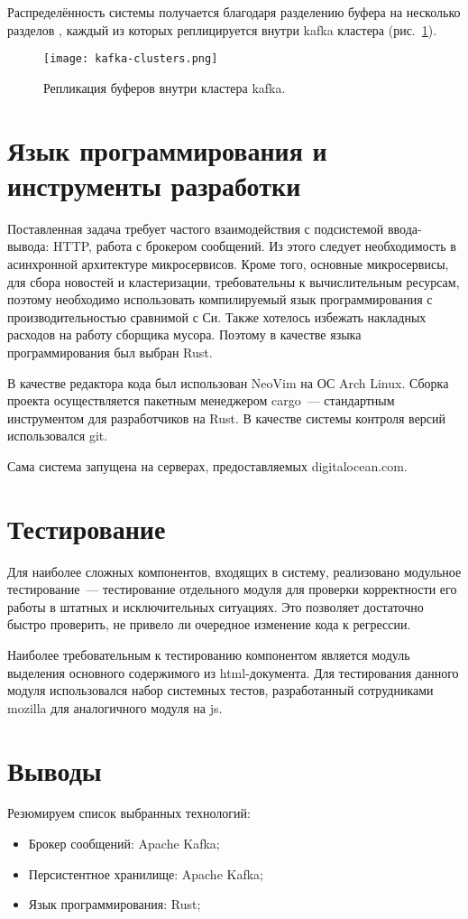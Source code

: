 Распределённость системы получается благодаря разделению буфера на несколько разделов \cite{wang12}, каждый из которых реплицируется внутри kafka кластера (рис.~\ref{fig:kafka-clusters}).

\begin{figure}[h]
    \centering
    \texttt{[image: kafka-clusters.png]}
    \caption{Репликация буферов внутри кластера kafka.}
    \label{fig:kafka-clusters}
\end{figure}

\section{Язык программирования и инструменты разработки}
Поставленная задача требует частого взаимодействия с подсистемой ввода-вывода: HTTP, работа с брокером сообщений. Из этого следует необходимость в асинхронной архитектуре микросервисов. Кроме того, основные микросервисы, для сбора новостей и кластеризации, требовательны к вычислительным ресурсам, поэтому необходимо использовать компилируемый язык программирования с производительностью сравнимой с Си. Также хотелось избежать накладных расходов на работу сборщика мусора. Поэтому в качестве языка программирования был выбран Rust.

В качестве редактора кода был использован NeoVim на ОС Arch Linux. Сборка проекта осуществляется пакетным менеджером cargo~--- стандартным инструментом для разработчиков на Rust. В качестве системы контроля версий использовался git.

Сама система запущена на серверах, предоставляемых digitalocean.com.

\section{Тестирование}
Для наиболее сложных компонентов, входящих в систему, реализовано модульное тестирование~--- тестирование отдельного модуля для проверки корректности его работы в штатных и исключительных ситуациях. Это позволяет достаточно быстро проверить, не привело ли очередное изменение кода к регрессии.

Наиболее требовательным к тестированию компонентом является модуль выделения основного содержимого из html-документа. Для тестирования данного модуля использовался набор системных тестов, разработанный сотрудниками mozilla для аналогичного модуля на js.

\section{Выводы}
Резюмируем список выбранных технологий:
\begin{itemize}
    \item Брокер сообщений: Apache Kafka;
    \item Персистентное хранилище: Apache Kafka;
    \item Язык программирования: Rust;
\end{itemize}
